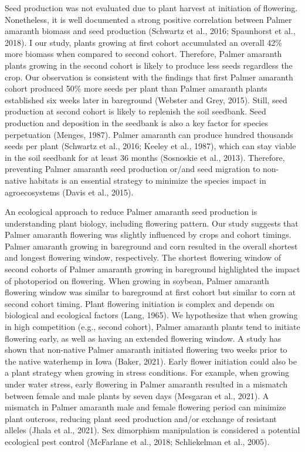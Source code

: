 \documentclass[utf8]{frontiersSCNS}
\begin{document}
Seed production was not evaluated due to plant harvest at initiation of
flowering. Nonetheless, it is well documented a strong positive
correlation between Palmer amaranth biomass and seed production
(Schwartz et al., 2016; Spaunhorst et al., 2018). I our study, plants
growing at first cohort accumulated an overall 42\% more biomass when
compared to second cohort. Therefore, Palmer amaranth plants growing in
the second cohort is likely to produce less seeds regardless the crop.
Our observation is consistent with the findings that first Palmer
amaranth cohort produced 50\% more seeds per plant than Palmer amaranth
plants established six weeks later in bareground (Webster and Grey,
2015). Still, seed production at second cohort is likely to replenish
the soil seedbank. Seed production and deposition in the seedbank is
also a key factor for species perpetuation (Menges, 1987). Palmer
amaranth can produce hundred thousands seeds per plant (Schwartz et al.,
2016; Keeley et al., 1987), which can stay viable in the soil seedbank
for at least 36 months (Sosnoskie et al., 2013). Therefore, preventing
Palmer amaranth seed production or/and seed migration to non-native
habitats is an essential strategy to minimize the species impact in
agroecosystems (Davis et al., 2015).

An ecological approach to reduce Palmer amaranth seed production is
understanding plant biology, including flowering pattern. Our study
suggests that Palmer amaranth flowering was slightly influenced by crops
and cohort timings. Palmer amaranth growing in bareground and corn
resulted in the overall shortest and longest flowering window,
respectively. The shortest flowering window of second cohorts of Palmer
amaranth growing in bareground highlighted the impact of photoperiod on
flowering. When growing in soybean, Palmer amaranth flowering window was
similar to bareground at first cohort but similar to corn at second
cohort timing. Plant flowering initiation is complex and depends on
biological and ecological factors (Lang, 1965). We hypothesize that when
growing in high competition (e.g., second cohort), Palmer amaranth
plants tend to initiate flowering early, as well as having an extended
flowering window. A study has shown that non-native Palmer amaranth
initiated flowering two weeks prior to the native waterhemp in Iowa
(Baker, 2021). Early flower initiation could also be a plant strategy
when growing in stress conditions. For example, when growing under water
stress, early flowering in Palmer amaranth resulted in a mismatch
between female and male plants by seven days (Mesgaran et al., 2021). A
mismatch in Palmer amaranth male and female flowering period can
minimize plant outcross, reducing plant seed production and/or exchange
of resistant alleles (Jhala et al., 2021). Sex dimorphism manipulation
is considered a potential ecological pest control (McFarlane et al.,
2018; Schliekelman et al., 2005).
\end{document}
